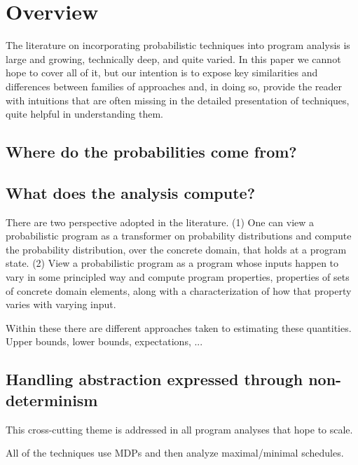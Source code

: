 \section{Overview}
\label{sec:overview}

The literature on incorporating probabilistic techniques into 
program analysis is large and growing, technically deep, and quite
varied.  In this paper we cannot hope to cover all of it, but our
intention is to expose key similarities and differences between 
families of approaches and, in doing so, provide the reader with
intuitions that are often missing in the detailed presentation of
techniques, quite helpful in understanding them.

\subsection{Where do the probabilities come from?}

\subsection{What does the analysis compute?}
There are two perspective adopted in the literature.
(1) One can view a probabilistic program as a transformer on probability
distributions and compute the probability distribution, over the
concrete domain, that holds at a program state.
(2) View a probabilistic program as a program whose inputs happen
to vary in some principled way and compute program properties, 
properties of sets of concrete domain elements, along with a characterization
of how that property varies with varying input.


Within these there are different approaches taken to estimating
these quantities.  Upper bounds, lower bounds, expectations, ...

\subsection{Handling abstraction expressed through non-determinism}
This cross-cutting theme is addressed in all program analyses that
hope to scale. 

All of the techniques use MDPs and then analyze maximal/minimal
schedules.


